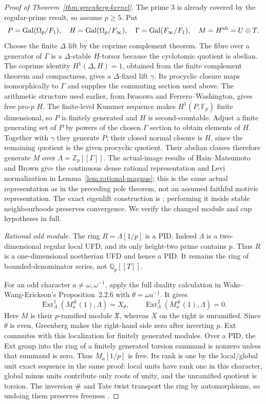 \begin{proof}[Proof of Theorem~\ref{thm:greenberg-kernel}]
The prime $3$ is already covered by the regular-prime result, so
assume $p\ge5$. Put
\[
 P=\operatorname{Gal}(\Omega_p/F_1),\quad
 H=\operatorname{Gal}(\Omega_p/F_\infty),\quad
 \Gamma=\operatorname{Gal}(F_\infty/F_1),\quad
 M=H^{\rm ab}=U\oplus T.
\]
Choose the finite $\Delta$ lift by the coprime complement theorem.
The fibre over a generator of $\Gamma$ is a $\Delta$-stable
$H$-torsor because the cyclotomic quotient is abelian.
The coprime identity $H^1(\Delta,H)=1$, obtained from the finite
complement theorem and compactness, gives a $\Delta$-fixed lift
$\gamma$. Its procyclic closure maps isomorphically to $\Gamma$
and supplies the commuting section used above.
The arithmetic structure used earlier, from Iwasawa and
Ferrero--Washington, gives free pro-$p$ $H$.
The finite-level Kummer sequence makes $H^1(P,\mathbb F_p)$
finite dimensional, so $P$ is finitely generated and $H$ is
second-countable. Adjust a finite generating set of $P$ by powers
of the chosen $\Gamma$ section to obtain elements of $H$.
Together with $\gamma$ they generate $P$; their closed normal
closure is $H$, since the remaining quotient is the given
procyclic quotient. Their abelian classes therefore generate $M$
over $\Lambda=\mathbb Z_p[[\Gamma]]$.
The actual-image results of Hain--Matsumoto and Brown give the
continuous dense rational representation and Levi normalization in
Lemma~\ref{lem:rational-magnus}; this is the same actual
representation as in the preceding pole theorem, not an assumed
faithful motivic representation. The exact eigenlift construction
is \cite[Lemma~2.1, pp.~3--4]{Sharifi2002}; performing it inside
stable neighbourhoods preserves convergence. We verify the changed
module and cup hypotheses in full.

\emph{Rational odd module.}
The ring $R=\Lambda[1/p]$ is a PID. Indeed $\Lambda$ is a
two-dimensional regular local UFD, and its only height-two prime
contains $p$. Thus $R$ is a one-dimensional noetherian UFD and
hence a PID. It remains the ring of bounded-denominator series,
not $\mathbb Q_p[[T]]$.

For an odd character $a\ne\omega,\omega^{-1}$, apply the full
duality calculation in Wake--Wang-Erickson's Proposition~2.2.6
with $\theta=\omega a^{-1}$. It gives
\[
 \operatorname{Ext}^1_\Lambda(M_a^{\#}(1),\Lambda)=X_\theta,
 \qquad
 \operatorname{Ext}^2_\Lambda(M_a^{\#}(1),\Lambda)=0.           \tag{GM.7}
\]
Here $M$ is their $p$-ramified module $\mathfrak X$, whereas $X$
on the right is unramified. Since $\theta$ is even, Greenberg
makes the right-hand side zero after inverting $p$. Ext commutes
with this localization for finitely generated modules. Over a PID,
the Ext group into the ring of a finitely generated torsion summand
is nonzero unless that summand is zero. Thus $M_a[1/p]$ is free.
Its rank is one by the local/global unit exact sequence in the
same proof: local units have rank one in this character, global
minus units contribute only roots of unity, and the unramified
quotient is torsion. The inversion $\#$ and Tate twist transport
the ring by automorphisms, so undoing them preserves freeness
\cite[Proposition~2.2.6 and proof, pp.~3--4]{WakeWangErickson2017}.


\end{proof}

